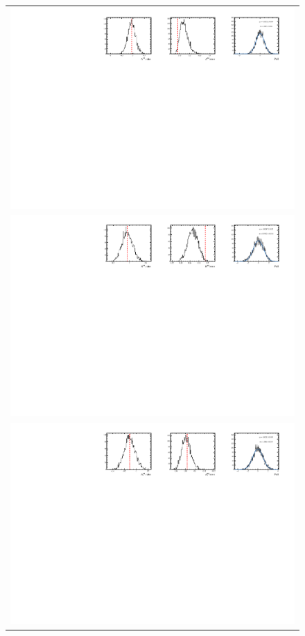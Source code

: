 \begin{figure}
  \centering
  \begin{tabular}{c}
\includegraphics[width=\textwidth]{ANA_resources/Plots/Data_fit/FitterBias//CombinedRuns//A_signal_pipi.pdf} \\
\includegraphics[width=\textwidth]{ANA_resources/Plots/Data_fit/FitterBias//CombinedRuns//R_signal_pipi.pdf} \\
\includegraphics[width=\textwidth]{ANA_resources/Plots/Data_fit/FitterBias//CombinedRuns//A_Bs_pipi.pdf} \\

\end{tabular}
\end{figure}
